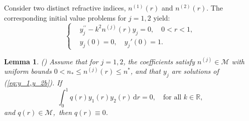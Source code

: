 \documentclass[11pt,reqno]{amsart}
\newtheorem{lemma}{Lemma}[section]
\theoremstyle{definition}
\theoremstyle{remark}
\numberwithin{equation}{section}
\begin{document}

Consider two distinct refractive indices, $n^{(1)}(r)$ and $n^{(2)}(r)$. The corresponding initial value problems for $j = 1, 2$ yield:
\begin{equation}\label{eq:y_1,y_2b}
	\left\{
	\begin{aligned}
		&y_j^{\prime\prime} - k^{2} n^{(j)}(r) y_j = 0, \quad 0 < r < 1,\\
		&y_j(0) = 0, \quad y_j'(0) = 1.
	\end{aligned}
	\right.
\end{equation}
\begin{lemma}\label{lem:completeness}(\cite{Ram09})
Assume that for $j=1,2$, the coefficients satisfy $n^{(j)} \in \mathcal{M}$ with uniform bounds $0 < n_* \leq n^{(j)}(r) \leq n^*$, and that $y_j$ are solutions of (\ref{eq:y_1,y_2b}). If
\begin{equation*}
	\int_{0}^{1} q(r) y_1(r) y_2(r) \,\mathrm{d}r = 0, \quad \text{for all } k \in \mathbb{R},
\end{equation*}
and $q(r)\in \mathcal{M}$,~then $q(r) \equiv 0$.
\end{lemma}

\end{document}
